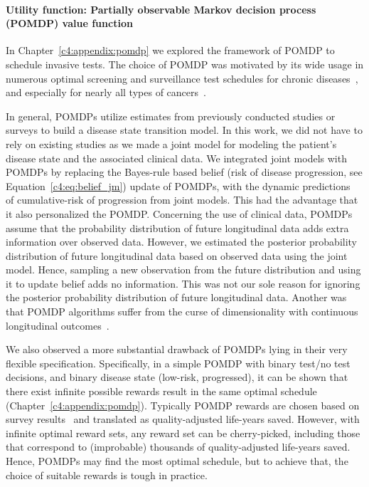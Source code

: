 \paragraph{Utility function: Partially observable Markov decision process (POMDP) value function} In Chapter~\ref{c4:appendix:pomdp} we explored the framework of POMDP to schedule invasive tests. The choice of POMDP was motivated by its wide usage in numerous optimal screening and surveillance test schedules for chronic diseases~\citep{steimle2017markov,denton2018optimization}, and especially for nearly all types of cancers~\citep{alagoz2010operations}. 

In general, POMDPs utilize estimates from previously conducted studies or surveys to build a disease state transition model. In this work, we did not have to rely on existing studies as we made a joint model for modeling the patient's disease state and the associated clinical data. We integrated joint models with POMDPs by replacing the Bayes-rule based belief (risk of disease progression, see Equation~\ref{c4:eq:belief_jm}) update of POMDPs, with the dynamic predictions~\citep{rizopoulos2017dynamic} of cumulative-risk of progression from joint models. This had the advantage that it also personalized the POMDP. Concerning the use of clinical data, POMDPs assume that the probability distribution of future longitudinal data adds extra information over observed data. However, we estimated the posterior probability distribution of future longitudinal data based on observed data using the joint model. Hence, sampling a new observation from the future distribution and using it to update belief adds no information. This was not our sole reason for ignoring the posterior probability distribution of future longitudinal data. Another was that POMDP algorithms suffer from the curse of dimensionality with continuous longitudinal outcomes~\citep{sunberg2018online}.

We also observed a more substantial drawback of POMDPs lying in their very flexible specification. Specifically, in a simple POMDP with binary test/no test decisions, and binary disease state (low-risk, progressed), it can be shown that there exist infinite possible rewards result in the same optimal schedule (Chapter~\ref{c4:appendix:pomdp}). Typically POMDP rewards are chosen based on survey results~\citep{denton2018optimization} and translated as quality-adjusted life-years saved. However, with infinite optimal reward sets, any reward set can be cherry-picked, including those that correspond to (improbable) thousands of quality-adjusted life-years saved. Hence, POMDPs may find the most optimal schedule, but to achieve that, the choice of suitable rewards is tough in practice.

